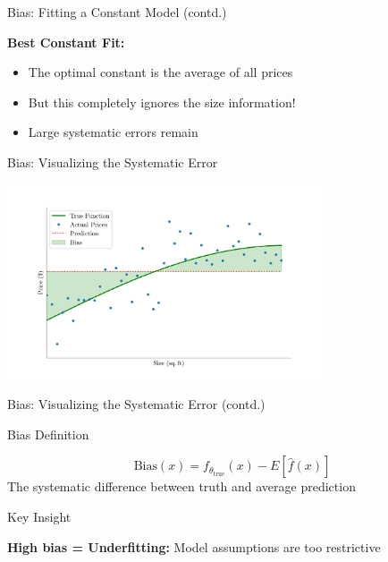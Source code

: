 \documentclass[10pt]{beamer}
\newcommand{\fitpic}[1]{\begin{adjustbox}{max width=\linewidth, max totalheight=0.78\textheight}#1\end{adjustbox}}
\begin{document}

\begin{frame}{Bias: Fitting a Constant Model (contd.)}
\footnotesize
\begin{keypointsbox}
\raggedright
\textbf{Best Constant Fit:} 
\begin{itemize}
\item The optimal constant is the average of all prices
\item But this completely ignores the size information!
\item Large systematic errors remain
\end{itemize}
\end{keypointsbox}
\end{frame}


\begin{frame}{Bias: Visualizing the Systematic Error}
\footnotesize
\begin{center}
\fitpic{\includegraphics[width=0.7\textwidth]{../assets/bias-variance/figures/biasn-3.pdf}}
\end{center}
\end{frame}

\begin{frame}{Bias: Visualizing the Systematic Error (contd.)}
\footnotesize
\begin{definitionbox}{Bias Definition}
\raggedright
$$\text{Bias}(x) = f_{\theta_{\text{true}}}(x) - E[\hat{f}(x)]$$
The systematic difference between truth and average prediction
\end{definitionbox}

\begin{alertbox}{Key Insight}
\raggedright
\textbf{High bias = Underfitting:} Model assumptions are too restrictive
\end{alertbox}
\end{frame}
\end{document}
